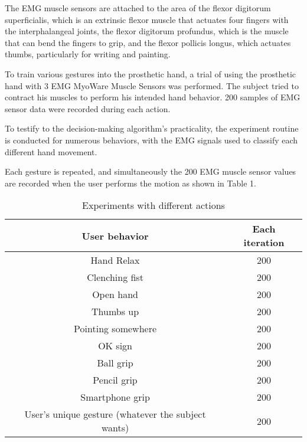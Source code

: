 The EMG muscle sensors are attached to the area of the flexor
digitorum superficialis, which is an extrinsic flexor muscle that
actuates four fingers with the interphalangeal joints, the flexor
digitorum profundus, which is the muscle that can bend the fingers to
grip, and the flexor pollicis longus, which actuates thumbs,
particularly for writing and painting.

To train various gestures into the prosthetic hand, a trial of using
the prosthetic hand with 3 EMG MyoWare Muscle Sensors was
performed. The subject tried to contract his muscles to perform his
intended hand behavior.  200 samples of EMG sensor data were recorded
during each action.

To testify to the decision-making algorithm's practicality, the
experiment routine is conducted for numerous behaviors, with the EMG
signals used to classify each different hand movement.

Each gesture is repeated, and simultaneously the 200 EMG muscle sensor
values are recorded when the user performs the motion as shown in
Table 1.

\begin{table}[ht]
\caption{Experiments with different actions} %
\centering %
\begin{tabular}{c c} %
\hline\hline %
User behavior & Each iteration \\ [0.5ex] %
\hline %
Hand Relax & 200 \\ %
Clenching fist & 200 \\
Open hand & 200 \\
Thumbs up & 200 \\
Pointing somewhere & 200 \\
OK sign & 200 \\
Ball grip & 200 \\
Pencil grip & 200 \\
Smartphone grip & 200 \\
User's unique gesture (whatever the subject wants) & 200 \\ [1ex] %
\hline %
\end{tabular}
\label{table:nonlin} %
\end{table}



